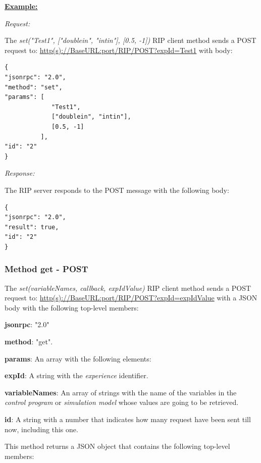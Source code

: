 \textbf{\underline{Example:}}

\textit{Request:}

The \textit{set("Test1", ["doublein", "intin"], [0.5, -1])} RIP client method sends a POST request to: \url{http(s)://BaseURL:port/RIP/POST?expId=Test1} with body:

\begin{lstlisting}
{
"jsonrpc": "2.0",
"method": "set",
"params": [
	         "Test1",
	         ["doublein", "intin"],
	         [0.5, -1]
          ],
"id": "2"
}
\end{lstlisting}

\textit{Response:}

The RIP server responds to the POST message with the following body:

\begin{lstlisting}
{
"jsonrpc": "2.0",
"result": true,
"id": "2"
}
\end{lstlisting}

\subsubsection{Method get - POST}
The \textit{set(variableNames, callback, expIdValue)} RIP client method sends a POST request to: \url{http(s)://BaseURL:port/RIP/POST?expId=expIdValue} with a JSON body with the following top-level members:

\begin{myEnumerate}
    \item \textbf{jsonrpc}: "2.0"
    \item \textbf{method}: "get".
    \item \textbf{params}: An array with the following elements:
    \begin{myEnumerate}
        \item \textbf{expId}: A string with the \textit{experience} identifier.
        \item \textbf{variableNames}: An array of strings with the name of the variables in the \textit{control program} or \textit{simulation model} whose values are going to be retrieved.
    \end{myEnumerate}
    \item \textbf{id}: A string with a number that indicates how many request have been sent till now, including this one.
\end{myEnumerate}

This method returns a JSON object that contains the following top-level members:

